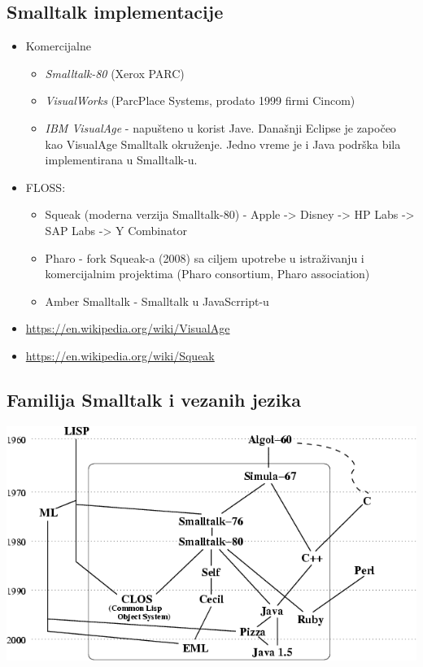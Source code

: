 \documentclass[presentation]{beamer}
\begin{document}
\subsection{Smalltalk implementacije}
\label{sec:org67067ac}
\begin{itemize}
\item Komercijalne
\begin{itemize}
\item \emph{Smalltalk-80} (Xerox PARC)
\item \emph{VisualWorks} (ParcPlace Systems, prodato 1999 firmi Cincom)
\item \emph{IBM VisualAge} - napušteno u korist Jave. Današnji Eclipse je započeo kao
VisualAge Smalltalk okruženje. Jedno vreme je i Java podrška bila
implementirana u Smalltalk-u.
\end{itemize}

\item FLOSS:
\begin{itemize}
\item Squeak (moderna verzija Smalltalk-80) - Apple -> Disney -> HP Labs -> SAP
Labs -> Y Combinator
\item Pharo - fork Squeak-a (2008) sa ciljem upotrebe u istraživanju i
komercijalnim projektima (Pharo consortium, Pharo association)
\item Amber Smalltalk - Smalltalk u JavaScrript-u
\end{itemize}
\end{itemize}

\begin{itemize}
\item \url{https://en.wikipedia.org/wiki/VisualAge}
\item \url{https://en.wikipedia.org/wiki/Squeak}
\end{itemize}

\subsection{Familija Smalltalk i vezanih jezika}
\label{sec:orgb5f059e}

\begin{center}
\includegraphics[width=.9\linewidth]{./slike/smalltalk-history.png}
\end{center}
\end{document}
